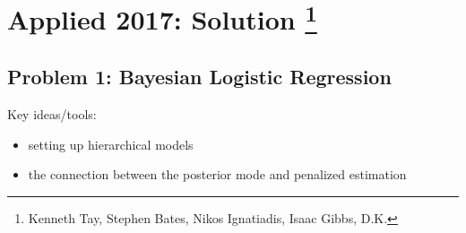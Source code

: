 \section{Applied 2017: Solution \footnote{Kenneth Tay, Stephen Bates, Nikos Ignatiadis, Isaac Gibbs, D.K.}}

\subsection*{Problem 1: Bayesian Logistic Regression}
Key ideas/tools:
\begin{itemize}
\item setting up hierarchical models
\item the connection between the posterior mode and penalized estimation
\end{itemize}

